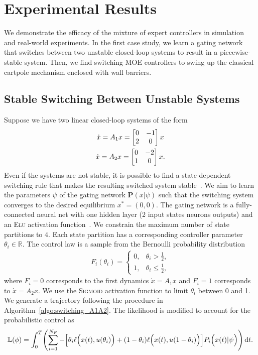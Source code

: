 \section{Experimental Results}
\label{sec:moe_results}
We demonstrate the efficacy of the mixture of expert controllers in simulation
and real-world experiments.
%
In the first case study, we learn a gating network that switches between two
unstable closed-loop systems to result in a piecewise-stable system.
%
Then, we find switching MOE controllers to swing up the classical cartpole
mechanism enclosed with wall barriers.
%

\subsection{Stable Switching Between Unstable Systems}

Suppose we have two linear closed-loop systems of the form 
\begin{equation}
    \begin{gathered}
        \dot{x} = A_1x = \begin{bmatrix}0 & -1 \\ 2 & 0\end{bmatrix}x \\
        \dot{x} = A_2x = \begin{bmatrix}0 & -2 \\ 1 & 0\end{bmatrix}x.
    \end{gathered}
    \label{eq:unstable_closedloop}
\end{equation}
%
Even if the systems are not stable, it is possible to find a state-dependent
switching rule that makes the resulting switched system
stable~\cite{liberzon2003switching}. 
%
We aim to learn the parameters $\psi$ of the gating network $\mathbf{P}(x|
\psi)$ such that the switching system converges to the desired equilibrium $x^*
= (0, 0)$.
%
The gating network is a fully-connected neural net with one hidden layer (2 input states 
 neurons  outputs) and an \textsc{Elu} activation
function~\cite{clevert2015fast}.
%
We constrain the maximum number of state partitions to $4$.
%
Each state partition has a corresponding controller parameter $\theta_i \in
\mathbb{R}$. 
%
The control law is a sample from the Bernoulli probability distribution
\begin{align}
    F_i(\theta_i) = \begin{cases}
       0, & \theta_i > \frac{1}{2}, \\
       1, & \theta_i \leq \frac{1}{2},
    \end{cases}
\end{align}
\noindent where $F_i = 0$ corresponds to the first dynamics $\dot{x} = A_1
x$ and $F_i=1$ corresponds to $\dot{x} = A_2x$.
%
We use the \textsc{Sigmoid} activation function to limit $\theta_i$ between 0
and 1.
%
We generate a trajectory following the procedure in
Algorithm~\eqref{algo:switching_A1A2}.
%
The likelihood is modified to account for the probabilistic control as
\begin{align*}
    \mathbb{L}(\phi) = \int_{0}^{T} \Biggl( \sum_{i=1}^{N_F} - \Bigl[ \theta_i \ell \Bigl(x(t), u(\theta_i) \Bigr) + (1- \theta_i)\ell \Bigl(x(t), u(1-\theta_i) \Bigr) \Bigr] P_i\Bigl(x(t)| \psi \Bigr)  \Biggr) \operatorname{d}\! t.
\end{align*}


